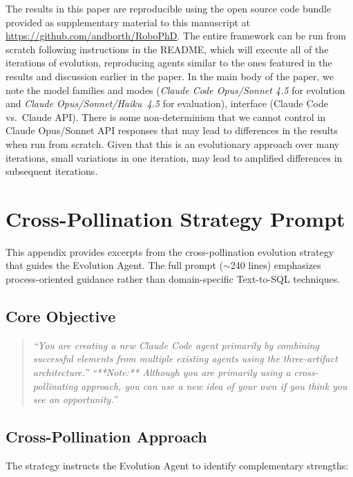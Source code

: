 \documentclass{article}
\begin{document}
The results in this paper are reproducible using the open source code bundle provided as supplementary material to this manuscript at \url{https://github.com/andborth/RoboPhD}. The entire framework can be run from scratch following instructions in the README, which will execute all of the iterations of evolution, reproducing agents similar to the ones featured in the results and discussion earlier in the paper. In the main body of the paper, we note the model families and modes (\emph{Claude Code Opus/Sonnet 4.5} for evolution and \emph{Claude Opus/Sonnet/Haiku~4.5} for evaluation), interface (Claude Code vs.\ Claude API). There is some non-determinism that we cannot control in Claude Opus/Sonnet API responses that may lead to differences in the results when run from scratch. Given that this is an evolutionary approach over many iterations, small variations in one iteration, may lead to amplified differences in subsequent iterations. 

\section{Cross-Pollination Strategy Prompt}
\label{app:evolution-prompts}

This appendix provides excerpts from the cross-pollination evolution strategy that guides the Evolution Agent. The full prompt ($\sim$240 lines) emphasizes process-oriented guidance rather than domain-specific Text-to-SQL techniques.

\subsection{Core Objective}

\begin{quote}
\textit{``You are creating a new Claude Code agent primarily by combining successful elements from multiple existing agents using the three-artifact architecture.''}
\textit{``**Note:** Although you are primarily using a cross-pollinating approach, you can use a new idea of your own if you think you see an opportunity.''}

\end{quote}

\subsection{Cross-Pollination Approach}

The strategy instructs the Evolution Agent to identify complementary strengths:
\end{document}
